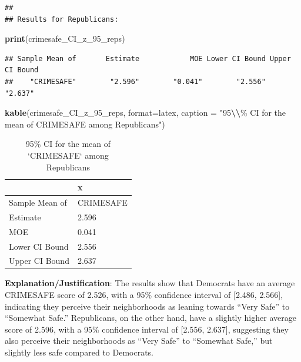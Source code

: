 \documentclass[
  11pt,
]{article}
\newenvironment{Shaded}{\begin{snugshade}}{\end{snugshade}}
\newcommand{\AttributeTok}[1]{\textcolor[rgb]{0.13,0.29,0.53}{#1}}
\newcommand{\FunctionTok}[1]{\textcolor[rgb]{0.13,0.29,0.53}{\textbf{#1}}}
\newcommand{\NormalTok}[1]{#1}
\newcommand{\SpecialCharTok}[1]{\textcolor[rgb]{0.81,0.36,0.00}{\textbf{#1}}}
\newcommand{\StringTok}[1]{\textcolor[rgb]{0.31,0.60,0.02}{#1}}
\begin{document}
\begin{verbatim}
##
## Results for Republicans:
\end{verbatim}

\begin{Shaded}
\begin{Highlighting}[]
\FunctionTok{print}\NormalTok{(crimesafe\_CI\_z\_95\_reps)}
\end{Highlighting}
\end{Shaded}

\begin{verbatim}
## Sample Mean of       Estimate            MOE Lower CI Bound Upper CI Bound
##    "CRIMESAFE"        "2.596"        "0.041"        "2.556"        "2.637"
\end{verbatim}

\begin{Shaded}
\begin{Highlighting}[]
\FunctionTok{kable}\NormalTok{(crimesafe\_CI\_z\_95\_reps, }\AttributeTok{format=}\StringTok{\textquotesingle{}latex\textquotesingle{}}\NormalTok{, }\AttributeTok{caption =} \StringTok{"95}\SpecialCharTok{\textbackslash{}\textbackslash{}}\StringTok{\% CI for the mean of \textasciigrave{}CRIMESAFE\textasciigrave{} among Republicans"}\NormalTok{)}
\end{Highlighting}
\end{Shaded}

\begin{table}

\caption{\label{tab:q1-d-part2}95\% CI for the mean of `CRIMESAFE` among Republicans}
\centering
\begin{tabular}[t]{l|l}
\hline
  & x\\
\hline
Sample Mean of & CRIMESAFE\\
\hline
Estimate & 2.596\\
\hline
MOE & 0.041\\
\hline
Lower CI Bound & 2.556\\
\hline
Upper CI Bound & 2.637\\
\hline
\end{tabular}
\end{table}

\textbf{Explanation/Justification}: The results show that Democrats have
an average CRIMESAFE score of 2.526, with a 95\% confidence interval of
{[}2.486, 2.566{]}, indicating they perceive their neighborhoods as
leaning towards ``Very Safe'' to ``Somewhat Safe.'' Republicans, on the
other hand, have a slightly higher average score of 2.596, with a 95\%
confidence interval of {[}2.556, 2.637{]}, suggesting they also perceive
their neighborhoods as ``Very Safe'' to ``Somewhat Safe,'' but slightly
less safe compared to Democrats.
\end{document}
